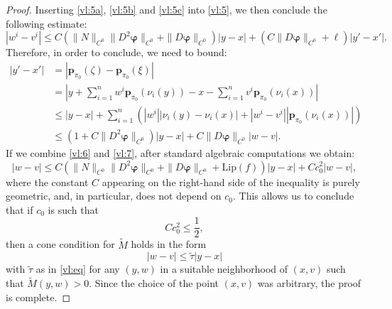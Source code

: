 \documentclass[a4paper,11pt,reqno]{amsart}
\theoremstyle{definition}
\numberwithin{equation}{section}
\numberwithin{subsection}{section}
\newcommand{\Lip}{\mathrm{Lip}}
\newcommand{\bphi}{\boldsymbol{\varphi}}
\newcommand{\p}{\mathbf{p}}
\begin{document}
\begin{proof}
Inserting \eqref{vl:5a}, \eqref{vl:5b} and \eqref{vl:5c} into \eqref{vl:5}, we then conclude the following estimate:
\begin{equation} \label{vl:6}
|w^{i} - v^{i}| \leq C \left( \|N\|_{C^0} \|D^{2}\bphi\|_{C^0} + \|D\bphi\|_{C^0} \right) |y - x| + \left( C \|D\bphi\|_{C^0} + \ell \right) |y' - x'|.
\end{equation}
Therefore, in order to conclude, we need to bound:
\begin{equation} \label{vl:7}
\begin{split}
|y' - x'| &= |\p_{\pi_0}(\zeta) - \p_{\pi_0}(\xi)| \\
&= \left|y + \sum_{i=1}^{n} w^{i} \p_{\pi_0}(\nu_{i}(y)) - x - \sum_{i=1}^{n} v^{i} \p_{\pi_0}(\nu_{i}(x))\right| \\
&\leq |y - x| + \sum_{i=1}^{n} \left( |w^{i}| |\nu_{i}(y) - \nu_{i}(x)| + |w^{i} - v^{i}| |\p_{\pi_0}(\nu_{i}(x))| \right) \\
&\leq \left( 1 + C \|D^{2}\bphi\|_{C^0} \right) |y - x| + C \|D\bphi\|_{C^0} |w - v|.
\end{split}
\end{equation}
If we combine \eqref{vl:6} and \eqref{vl:7}, after standard algebraic computations we obtain:
\begin{equation} \label{vl:8}
|w - v| \leq C \left( \|N\|_{C^0} \|D^{2}\bphi\|_{C^0} + \| D\bphi \|_{C^0} + \Lip(f) \right) |y - x| + C c_{0}^{2} |w - v|,
\end{equation}
where the constant $C$ appearing on the right-hand side of the inequality is purely geometric, and, in particular, does not depend on $c_0$. This allows us to conclude that if $c_0$ is such that
\begin{equation} \label{vl:9}
C c_{0}^{2} \leq \frac{1}{2},
\end{equation}
then a cone condition for $\widetilde{M}$ holds in the form
\begin{equation} \label{vl:10}
|w - v| \leq \tilde{\tau} |y - x|
\end{equation}
with $\tilde{\tau}$ as in \eqref{vl:eq} for any $(y,w)$ in a suitable neighborhood of $(x,v)$ such that $\widetilde{M}(y,w) > 0$. Since the choice of the point $(x,v)$ was arbitrary, the proof is complete.
\end{proof}
\end{document}
